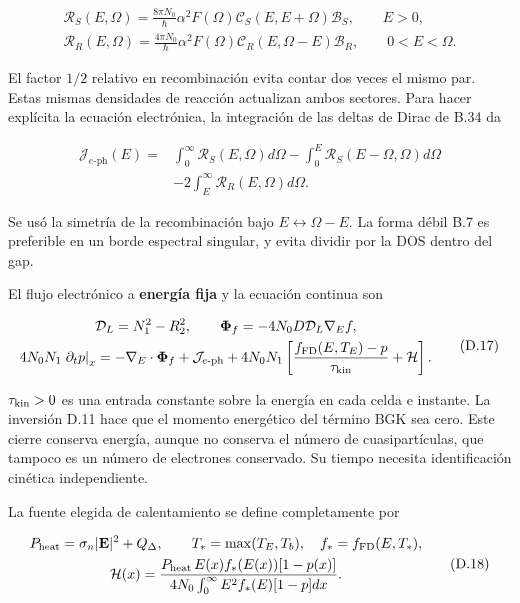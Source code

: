 \documentclass[
  spanish,
  10pt,
  a4paper,
]{article}
\begin{document}
\[
\begin{gathered}
\mathcal R_S(E,\Omega)=\frac{8\pi N_0}{\hbar}\alpha^2F(\Omega)
\mathcal C_S(E,E+\Omega)\mathcal B_S,\qquad E>0,\\
\mathcal R_R(E,\Omega)=\frac{4\pi N_0}{\hbar}\alpha^2F(\Omega)
\mathcal C_R(E,\Omega-E)\mathcal B_R,\qquad 0<E<\Omega.
\end{gathered}\tag{D.15}
\]

El factor \(1/2\) relativo en recombinación evita contar dos veces el
mismo par. Estas mismas densidades de reacción actualizan ambos
sectores. Para hacer explícita la ecuación electrónica, la integración
de las deltas de Dirac de B.34 da

\[
\begin{aligned}
\mathcal J_{e\text{-ph}}(E)={}&\int_0^\infty\mathcal R_S(E,\Omega)d\Omega
-\int_0^E\mathcal R_S(E-\Omega,\Omega)d\Omega\\
&-2\int_E^\infty\mathcal R_R(E,\Omega)d\Omega.
\end{aligned}\tag{D.16}
\]

Se usó la simetría de la recombinación bajo
\(E\leftrightarrow\Omega-E\). La forma débil B.7 es preferible en un
borde espectral singular, y evita dividir por la DOS dentro del gap.

El flujo electrónico a \textbf{energía fija} y la ecuación continua son

\[
\begin{gathered}
\mathcal D_L=N_1^2-R_2^2,\qquad
\boldsymbol\Phi_f=-4N_0D\mathcal D_L\nabla_E f,\\
4N_0N_1\left.\partial_t p\right|_x
=-\nabla_E\cdot\boldsymbol\Phi_f+\mathcal J_{e\text{-ph}}
+4N_0N_1\left[\frac{f_{\rm FD}(E,T_E)-p}{\tau_{\rm kin}}+\mathcal H\right].
\end{gathered}\tag{D.17}
\]

\(\tau_{\rm kin}>0\) es una entrada constante sobre la energía en cada
celda e instante. La inversión D.11 hace que el momento energético del
término BGK sea cero. Este cierre conserva energía, aunque no conserva
el número de cuasipartículas, que tampoco es un número de electrones
conservado. Su tiempo necesita identificación cinética independiente.

La fuente elegida de calentamiento se define completamente por

\[
\begin{gathered}
P_{\rm heat}=\sigma_n|\mathbf E|^2+Q_\Delta,\qquad
T_*=\max(T_E,T_b),\quad f_*=f_{\rm FD}(E,T_*),\\
\mathcal H(x)=\frac{P_{\rm heat}\,E(x)f_*(E(x))[1-p(x)]}
{4N_0\int_0^\infty E^2f_*(E)[1-p]dx}.
\end{gathered}\tag{D.18}
\]
\end{document}
